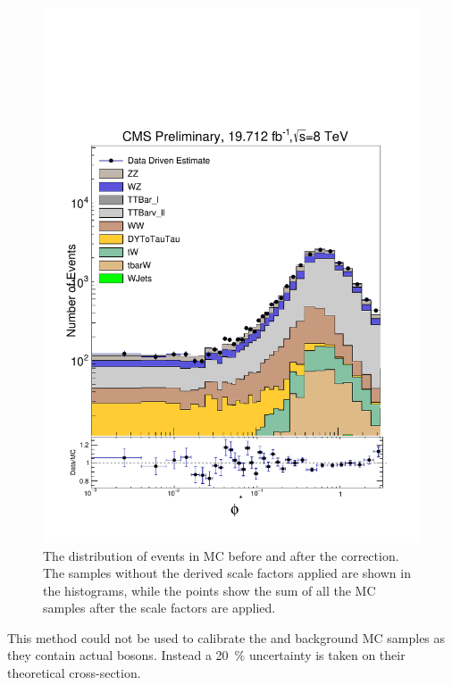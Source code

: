 \begin{figure}[!htbp]
    \centering
    \includegraphics[width=\textwidth]{figures/emu_check.pdf}
    \caption[
        The \phistar distribution of \Ztomumu events in MC before and after the
        \emu correction.
    ]{
        The \phistar distribution of \Ztomumu events in MC before and after the
        \emu correction. The samples without the \emu derived scale factors
        applied are shown in the histograms, while the points show the sum of
        all the MC samples after the scale factors are applied.
    }
    \label{fig:emu_after_correction}
\end{figure}

This method could not be used to calibrate the \WZ and \ZZ background MC
samples as they contain actual \Z bosons. Instead a \SI{20}{\percent}
uncertainty is taken on their theoretical cross-section.

